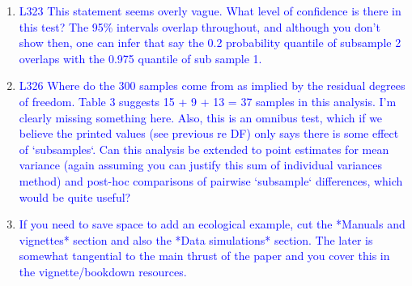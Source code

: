 \documentclass[12pt,letterpaper]{article}
\begin{document}
\begin{enumerate}
\item{\textcolor{blue}{L323 This statement seems overly vague. What level of confidence is there in this test? The 95\% intervals overlap throughout, and although you don't show then, one can infer that say the 0.2 probability quantile of subsample 2 overlaps with the 0.975 quantile of sub sample 1.}}


\item{\textcolor{blue}{L326 Where do the 300 samples come from as implied by the residual degrees of freedom. Table 3 suggests 15 + 9 + 13 = 37 samples in this analysis. I'm clearly missing something here. Also, this is an omnibus test, which if we believe the printed values (see previous re DF) only says there is some effect of `subsamples`. Can this analysis be extended to point estimates for mean variance (again assuming you can justify this sum of individual variances method) and post-hoc comparisons of pairwise `subsample` differences, which would be quite useful?}}


\item{\textcolor{blue}{If you need to save space to add an ecological example, cut the *Manuals and vignettes* section and also the *Data simulations* section. The later is somewhat tangential to the main thrust of the paper and you cover this in the vignette/bookdown resources.}}


\end{enumerate}
\end{document}

